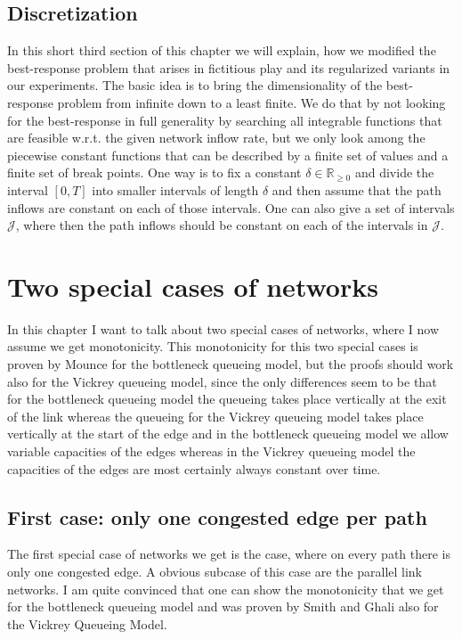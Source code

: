 \documentclass[reqno,openany]{amsbook}
\theoremstyle{definition}
\theoremstyle{plain}
\begin{document}
\section{Discretization}
In this short third section of this chapter we will explain, how we modified the best-response problem that arises in fictitious play and its regularized variants in our experiments. The basic idea is to bring the dimensionality of the best-response problem from infinite down to a least finite. We do that by not looking for the best-response in full generality by searching all integrable functions that are feasible w.r.t. the given network inflow rate, but we only look among the piecewise constant functions that can be described by a finite set of values and a finite set of break points. One way is to fix a constant $\delta \in \mathbb{R}_{\geq 0}$ and divide the interval $[0, T]$ into smaller intervals of length $\delta$ and then assume that the path inflows are constant on each of those intervals. One can also give a set of intervals $\mathcal{J}$, where then the path inflows should be constant on each of the intervals in $\mathcal{J}$.





\chapter{Two special cases of networks}
In this chapter I want to talk about two special cases of networks, where I now assume we get monotonicity. This monotonicity for this two special cases is proven by Mounce for the bottleneck queueing model, but the proofs should work also for the Vickrey queueing model, since the only differences seem to be that for the bottleneck queueing model the queueing takes place vertically at the exit of the link whereas the queueing for the Vickrey queueing model takes place vertically at the start of the edge and in the bottleneck queueing model we allow variable capacities of the edges whereas in the Vickrey queueing model the capacities of the edges are most certainly always constant over time. \\
\section{First case: only one congested edge per path}
The first special case of networks we get is the case, where on every path there is only one congested edge. A obvious subcase of this case are the parallel link networks. I am quite convinced that one can show the monotonicity that we get for the bottleneck queueing model and was proven by Smith and Ghali also for the Vickrey Queueing Model.
\end{document}
